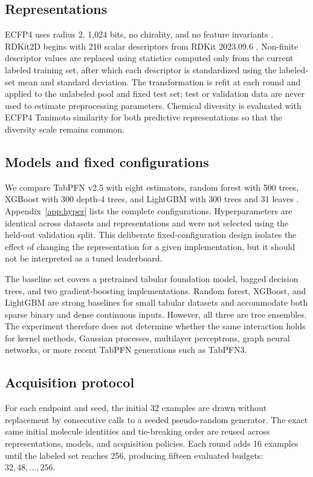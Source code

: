 \documentclass[twoside,11pt]{article}
\begin{document}
\subsection{Representations}
ECFP4 uses radius 2, 1,024 bits, no chirality, and no feature invariants \citep{rogers2010ecfp}. RDKit2D begins with 210 scalar descriptors from RDKit 2023.09.6 \citep{landrum2024rdkit}. Non-finite descriptor values are replaced using statistics computed only from the current labeled training set, after which each descriptor is standardized using the labeled-set mean and standard deviation. The transformation is refit at each round and applied to the unlabeled pool and fixed test set; test or validation data are never used to estimate preprocessing parameters. Chemical diversity is evaluated with ECFP4 Tanimoto similarity for both predictive representations so that the diversity scale remains common.

\subsection{Models and fixed configurations}
We compare TabPFN v2.5 with eight estimators, random forest with 500 trees, XGBoost with 300 depth-4 trees, and LightGBM with 300 trees and 31 leaves \citep{breiman2001random,chen2016xgboost,ke2017lightgbm}. Appendix~\ref{app:hyper} lists the complete configurations. Hyperparameters are identical across datasets and representations and were not selected using the held-out validation split. This deliberate fixed-configuration design isolates the effect of changing the representation for a given implementation, but it should not be interpreted as a tuned leaderboard.

The baseline set covers a pretrained tabular foundation model, bagged decision trees, and two gradient-boosting implementations. Random forest, XGBoost, and LightGBM are strong baselines for small tabular datasets and accommodate both sparse binary and dense continuous inputs. However, all three are tree ensembles. The experiment therefore does not determine whether the same interaction holds for kernel methods, Gaussian processes, multilayer perceptrons, graph neural networks, or more recent TabPFN generations such as TabPFN3.

\subsection{Acquisition protocol}
For each endpoint and seed, the initial 32 examples are drawn without replacement by consecutive calls to a seeded pseudo-random generator. The exact same initial molecule identities and tie-breaking order are reused across representations, models, and acquisition policies. Each round adds 16 examples until the labeled set reaches 256, producing fifteen evaluated budgets: $32,48,\ldots,256$.
\end{document}
